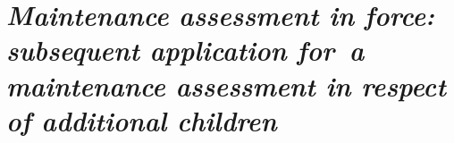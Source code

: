 \documentclass[a4paper,12pt]{article}
\begin{document}
%

\section*{\itshape Maintenance assessment in force: subsequent application for~a maintenance assessment in respect of additional children}
\end{document}
